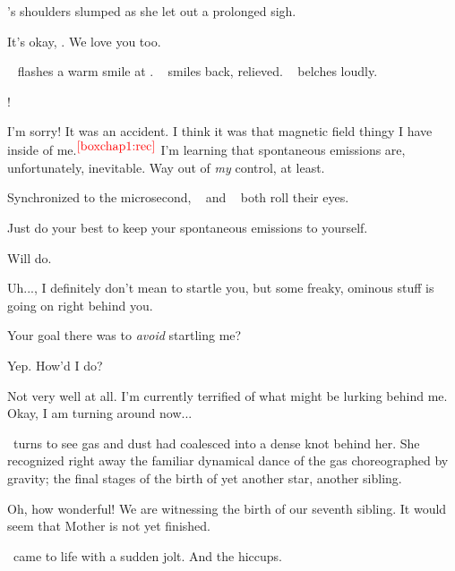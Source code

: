\documentclass[main.tex]{subfiles}
\begin{document}
\par \nar \rmmaia's shoulders slumped as she let out a prolonged sigh.

\par \Sterope It's okay, \rmmaia.  We love you too.

\par \nar \rmsterope~ flashes a warm smile at \rmmaia.  \rmmaia~ smiles back, relieved.  \rmalcyone~ belches loudly.

\par \Sterope \rmalcyone!

\par \Alcyone I'm sorry!  It was an accident.  I think it was that magnetic field thingy I have inside of me.$^{\textcolor{red}{\ref{boxchap1:rec}}}$  I'm learning that spontaneous emissions are, unfortunately, inevitable.  Way out of \textit{my} control, at least.

\par \nar Synchronized to the microsecond, \rmmaia~ and \rmsterope~ both roll their eyes.

\par \Maia Just do your best to keep your spontaneous emissions to yourself.

\par \Alcyone Will do. 

\par \Electra Uh...\rmmaia, I definitely don't mean to startle you, but some freaky, ominous stuff is going on right behind you.

\par \Maia Your goal there was to \textit{avoid} startling me?

\par \Electra Yep.  How'd I do?

\par \Maia Not very well at all.  I'm currently terrified of what might be lurking behind me.  Okay, I am turning around now...

\par \nar \rmmaia~turns to see gas and dust had coalesced into a dense knot behind her.  She recognized right away the familiar dynamical dance of the gas choreographed by gravity; the final stages of the birth of yet another star, another sibling.

\par \Maia Oh, how wonderful!  We are witnessing the birth of our seventh sibling.  It would seem that Mother is not yet finished.

\par \nar \rmmerope~came to life with a sudden jolt.  And the hiccups.  
\end{document}
